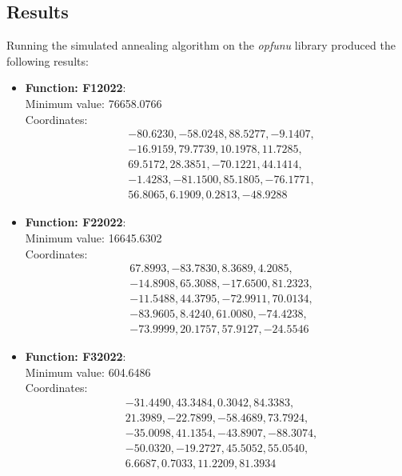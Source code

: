 \documentclass{article}
\begin{document}
\subsection{Results}

Running the simulated annealing algorithm on the \textit{opfunu} library
produced the following results:

\begin{itemize}
  \item \textbf{Function: F12022}: \\
    Minimum value: 76658.0766 \\
    Coordinates:
    \[
      \begin{aligned}
        & -80.6230, -58.0248, 88.5277, -9.1407, \\
        & -16.9159, 79.7739, 10.1978, 11.7285, \\
        & 69.5172, 28.3851, -70.1221, 44.1414, \\
        & -1.4283, -81.1500, 85.1805, -76.1771, \\
        & 56.8065, 6.1909, 0.2813, -48.9288
      \end{aligned}
    \]

  \item \textbf{Function: F22022}: \\
    Minimum value: 16645.6302 \\
    Coordinates:
    \[
      \begin{aligned}
        & 67.8993, -83.7830, 8.3689, 4.2085, \\
        & -14.8908, 65.3088, -17.6500, 81.2323, \\
        & -11.5488, 44.3795, -72.9911, 70.0134, \\
        & -83.9605, 8.4240, 61.0080, -74.4238, \\
        & -73.9999, 20.1757, 57.9127, -24.5546
      \end{aligned}
    \]

  \item \textbf{Function: F32022}: \\
    Minimum value: 604.6486 \\
    Coordinates:
    \[
      \begin{aligned}
        & -31.4490, 43.3484, 0.3042, 84.3383, \\
        & 21.3989, -22.7899, -58.4689, 73.7924, \\
        & -35.0098, 41.1354, -43.8907, -88.3074, \\
        & -50.0320, -19.2727, 45.5052, 55.0540, \\
        & 6.6687, 0.7033, 11.2209, 81.3934
      \end{aligned}
    \]


\end{itemize}
\end{document}

